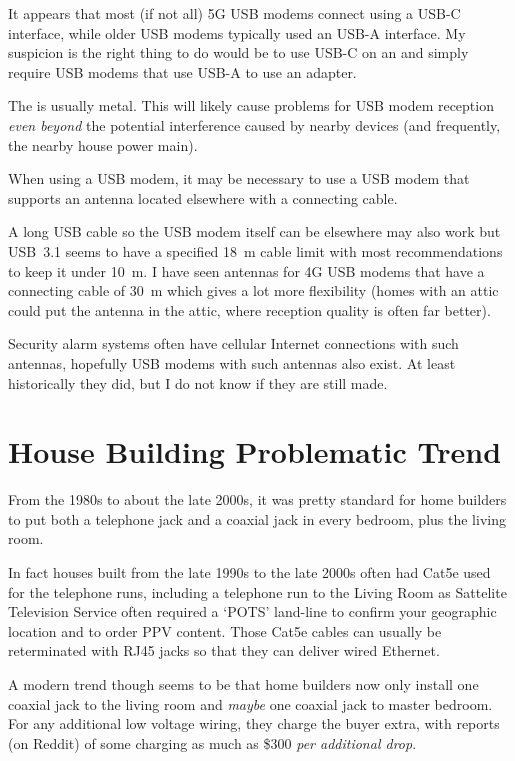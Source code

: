 It appears that most (if not all) 5G USB modems connect using a USB-C interface, while older USB modems typically
used an USB-A interface. My suspicion is the right thing to do would be to use USB-C on an 
and simply require USB modems that use USB-A to use an adapter.

The \tcab{} is usually metal. This will likely cause problems for USB modem
reception \emph{even beyond} the potential interference caused by nearby devices (and frequently, the nearby house
power main).

When using a USB modem, it may be necessary to use a USB modem that supports an antenna located elsewhere with a
connecting cable.

A long USB cable so the USB modem itself can be elsewhere may also work but USB~3.1 seems to have a specified
\SI{18}{\meter} cable limit with most recommendations to keep it under \SI{10}{\meter}. I have seen antennas for 4G
USB modems that have a connecting cable of \SI{30}{\meter} which gives a lot more flexibility (homes with an attic
could put the antenna in the attic, where reception quality is often far better).




Security alarm systems often have cellular Internet connections with such antennas, hopefully
USB modems with such antennas also exist. At least historically they did, but I do not know if they are still made.


\section{House Building Problematic Trend}

From the 1980s to about the late 2000s, it was pretty standard for home builders to put both a telephone jack
and a coaxial jack in every bedroom, plus the living room.

In fact houses built from the late 1990s to the late 2000s often had Cat5e used for the telephone runs, including
a telephone run to the Living Room as Sattelite Television Service often required a `POTS' land-line to confirm
your geographic location and to order PPV content. Those Cat5e cables can usually be reterminated with RJ45 jacks
so that they can deliver wired Ethernet.

A modern trend though seems to be that home builders now only install one coaxial jack to the living room and
\emph{maybe} one coaxial jack to master bedroom. For any additional low voltage wiring, they charge the buyer
extra, with reports (on Reddit) of some charging as much as \$300 \emph{per additional drop}.

